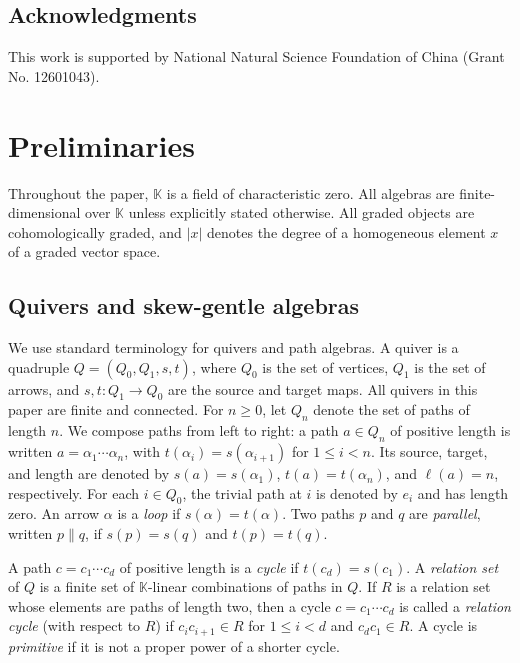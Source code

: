 \documentclass[11pt,a4paper,reqno]{amsart}
\newcommand{\mK}{\mathbb K}
\theoremstyle{plain}
\theoremstyle{definition}
\numberwithin{equation}{section}
\begin{document}
    	\subsection*{Acknowledgments}
    This work is supported by National Natural Science Foundation of China (Grant No. 12601043).
    
	\section{Preliminaries}\label{sec:preliminaries}
	
	Throughout the paper, $\mK$ is a field of characteristic zero. All algebras are finite-dimensional over $\mK$ unless explicitly stated otherwise. All graded objects are cohomologically graded, and $|x|$ denotes the degree of a homogeneous element $x$ of a graded vector space. 
	\subsection{Quivers and skew-gentle algebras}
	
	We use standard terminology for quivers and path algebras. A quiver is a quadruple
	$Q=(Q_0,Q_1,s,t)$, where $Q_0$ is the set of vertices, $Q_1$ is the set of
	arrows, and $s,t:Q_1\to Q_0$ are the source and target maps. All quivers in
	this paper are finite and connected. For $n\geq0$, let $Q_n$ denote the set
	of paths of length $n$. We compose paths from left to right: a path
	$a\in Q_n$ of positive length is written
	$a=\alpha_1\cdots\alpha_n$, with $t(\alpha_i)=s(\alpha_{i+1})$ for
	$1\leq i<n$. Its source, target, and length are denoted by
	$s(a)=s(\alpha_1)$, $t(a)=t(\alpha_n)$, and $\ell(a)=n$, respectively. For
	each $i\in Q_0$, the trivial path at $i$ is denoted by $e_i$ and has length
	zero. An arrow $\alpha$ is a \emph{loop} if $s(\alpha)=t(\alpha)$. Two paths
	$p$ and $q$ are \emph{parallel}, written $p\parallel q$, if
	$s(p)=s(q)$ and $t(p)=t(q)$.
	
	A path $c=c_1\cdots c_d$ of positive length is a \emph{cycle} if
	$t(c_d)=s(c_1)$. A \emph{relation set} of $Q$ is a finite set of
	$\mK$-linear combinations of paths in $Q$. If $R$ is a relation set whose
	elements are paths of length two, then a cycle $c=c_1\cdots c_d$ is called a
	\emph{relation cycle} (with respect to $R$) if
	$c_ic_{i+1}\in R$ for $1\leq i<d$ and $c_dc_1\in R$. A cycle is
	\emph{primitive} if it is not a proper power of a shorter cycle.
	
\end{document}
